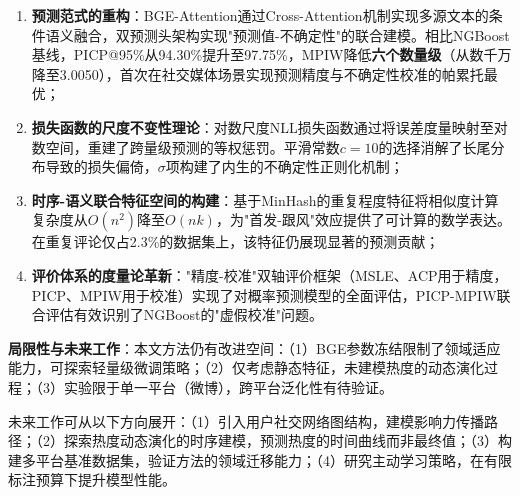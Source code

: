 \documentclass[10pt]{article}
\begin{document}
\begin{enumerate}[leftmargin=*]
    \item \textbf{预测范式的重构}：BGE-Attention通过Cross-Attention机制实现多源文本的条件语义融合，双预测头架构实现"预测值-不确定性"的联合建模。相比NGBoost基线，PICP@95\%从94.30\%提升至97.75\%，MPIW降低\textbf{六个数量级}（从数千万降至3.0050），首次在社交媒体场景实现预测精度与不确定性校准的帕累托最优；

    \item \textbf{损失函数的尺度不变性理论}：对数尺度NLL损失函数通过将误差度量映射至对数空间，重建了跨量级预测的等权惩罚。平滑常数$c=10$的选择消解了长尾分布导致的损失偏倚，$\sigma$项构建了内生的不确定性正则化机制；

    \item \textbf{时序-语义联合特征空间的构建}：基于MinHash的重复程度特征将相似度计算复杂度从$O(n^2)$降至$O(nk)$，为"首发-跟风"效应提供了可计算的数学表达。在重复评论仅占2.3\%的数据集上，该特征仍展现显著的预测贡献；

    \item \textbf{评价体系的度量论革新}："精度-校准"双轴评价框架（MSLE、ACP用于精度，PICP、MPIW用于校准）实现了对概率预测模型的全面评估，PICP-MPIW联合评估有效识别了NGBoost的"虚假校准"问题。
\end{enumerate}

\textbf{局限性与未来工作}：本文方法仍有改进空间：（1）BGE参数冻结限制了领域适应能力，可探索轻量级微调策略；（2）仅考虑静态特征，未建模热度的动态演化过程；（3）实验限于单一平台（微博），跨平台泛化性有待验证。

未来工作可从以下方向展开：（1）引入用户社交网络图结构，建模影响力传播路径；（2）探索热度动态演化的时序建模，预测热度的时间曲线而非最终值；（3）构建多平台基准数据集，验证方法的领域迁移能力；（4）研究主动学习策略，在有限标注预算下提升模型性能。
\end{document}
